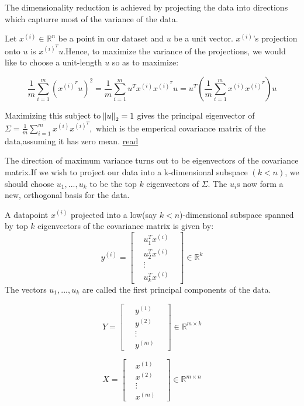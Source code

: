 \documentclass[12pt]{article}
\begin{document}
The dimensionality reduction is achieved by projecting the data into directions which capturre most of the variance of the data.

Let $x^{(i)} \in \mathbb{R}^{n}$ be a point in our dataset and $u$ be a unit vector. $x^{(i)}$'s projection onto $u$ is $x^{(i)^T}u$.Hence, to maximize the variance of the projections, we would like to choose a unit-length $u$ so as to maximize:
 
 $$\frac{1}{m} \sum_{i=1}^{m}(x^{(i)^T}u)^{2} = \frac{1}{m} \sum_{i=1}^{m} u^{T}x^{(i)}x^{(i)^T}u = u^{T} \left(\frac{1}{m} \sum_{i=1}^{m} x^{(i)}x^{(i)^T} \right)u$$
 
 Maximizing this subject to  $\norm{u}_{2}=1$ gives the principal eigenvector of $\Sigma = \frac{1}{m} \sum_{i=1}^{m} x^{(i)}x^{(i)^T} ,$ which is the emperical covariance matrix of the data,assuming it has zero mean. \href{https://math.stackexchange.com/questions/1199852/maximize-the-value-of-vtav}{read}
 
 The direction of maximum variance turns out to be eigenvectors of the covariance matrix.If we wish to project our data into a k-dimensional subspace $(k < n)$, we should choose $u_{1}, ..., u_{k}$ to be the top $k$ eigenvectors of $\Sigma$. The $u_{i}$s now form a new, orthogonal basis for the data.
 
 A datapoint $x^{(i)}$ projected into a low(say $k<n$)-dimensional subspace  spanned by top $k$ eigenvectors of the covariance matrix is given by:
 $$y^{(i)} =\begin{bmatrix} 
 	& u_{1}^{T}x^{(i)} &  \\
 	& u_{2}^{T}x^{(i)} &\\
 	& \vdots & \\
 	& u_{k}^{T}x^{(i)} &
 \end{bmatrix}  \in \mathbb{R}^{k}$$
 The vectors  $u_{1}, ..., u_{k}$ are called the first principal components of the data.
 
  $$ Y =\begin{bmatrix} 
 \	& y^{(1)} & \ \\
 \	& y^{(2)} & \ \\
 \	& \vdots &  \ \\
 \	& y^{(m)} &\
 \end{bmatrix}  \in \mathbb{R}^{m \times k}$$
 
 
 
 $$ X =\begin{bmatrix} 
 & x^{(1)} &  \\
 & x^{(2)} &\\
 & \vdots & \\
 & x^{(m)} &
 \end{bmatrix}  \in \mathbb{R}^{m \times n}$$
 
\end{document}
